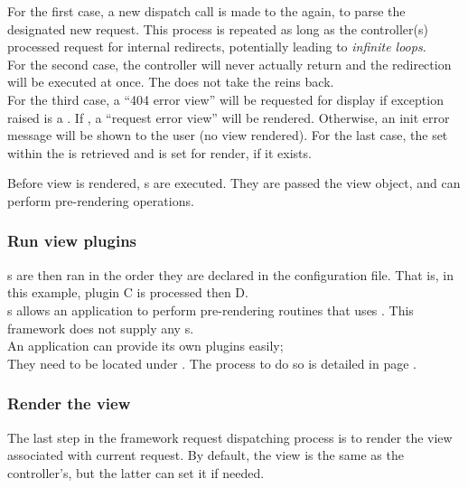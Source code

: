 \documentclass[pdftex,12pt,a4paper]{article}
\begin{document}
For the first case, a new dispatch call is made to the  again, to parse the designated new request. This process is repeated as long as the controller(s) processed request for internal redirects, potentially leading to \emph{infinite loops}. \\
For the second case, the controller will never actually return and the redirection will be executed at once. The  does not take the reins back. \\
For the third case, a ``404 error view'' will be requested for display if exception raised is a . If , a ``request error view'' will be rendered. Otherwise, an init error message will be shown to the user (no view rendered).
For the last case, the  set within the  is retrieved and is set for render, if it exists.

Before view is rendered, s are executed. They are passed the view object, and can perform pre-rendering operations.

\subsubsection{Run view plugins}

s are then ran in the order they are declared in the configuration file. That is, in this example, plugin C is processed then D. \\
s allows an application to perform pre-rendering routines that uses  . This framework does not supply any s.\\

An application can provide its own plugins easily;\\
They need to be located under . The process to do so is detailed in page \pageref{sec:view-plugins}.

\subsubsection{Render the view}

The last step in the framework request dispatching process is to render the view associated with current request. By default, the view  is the same as the controller's, but the latter can set it if needed.
\end{document}
